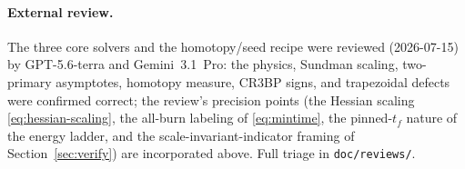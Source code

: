 \documentclass[11pt]{article}
\newcommand{\file}[1]{\texttt{\small #1}}
\begin{document}
\paragraph{External review.} The three core solvers and the homotopy/seed recipe
were reviewed (2026-07-15) by GPT-5.6-terra and Gemini~3.1~Pro: the physics,
Sundman scaling, two-primary asymptotes, homotopy measure, CR3BP signs, and
trapezoidal defects were confirmed correct; the review's precision points (the
Hessian scaling \eqref{eq:hessian-scaling}, the all-burn labeling of
\eqref{eq:mintime}, the pinned-$t_f$ nature of the energy ladder, and the
scale-invariant-indicator framing of Section~\ref{sec:verify}) are incorporated
above. Full triage in \file{doc/reviews/}.
\end{document}
